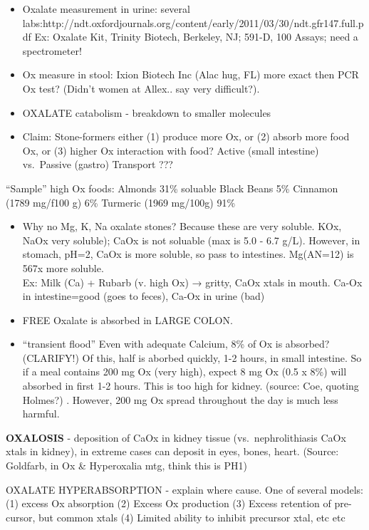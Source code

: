 \begin{itemize}
\tightlist
\item
  Oxalate measurement in urine: several
  labs:http://ndt.oxfordjournals.org/content/early/2011/03/30/ndt.gfr147.full.pdf
  Ex: Oxalate Kit, Trinity Biotech, Berkeley, NJ; 591-D, 100 Assays;
  need a spectrometer!\\
\item
  Ox measure in stool: Ixion Biotech Inc (Alac hug, FL) more exact then
  PCR Ox test? (Didn't women at Allex.. say very difficult?).
\item
  OXALATE catabolism - breakdown to smaller molecules
\item
  Claim: Stone-formers either (1) produce more Ox, or (2) absorb more
  food Ox, or (3) higher Ox interaction with food? Active (small
  intestine) vs.~Passive (gastro) Transport ???
\end{itemize}

``Sample'' high Ox foods: Almonds 31\% soluable Black Beans 5\% Cinnamon
(1789 mg/f100 g) 6\% Turmeric (1969 mg/100g) 91\%

\begin{itemize}
\tightlist
\item
  Why no Mg, K, Na oxalate stones? Because these are very soluble. KOx,
  NaOx very soluble); CaOx is not soluable (max is 5.0 - 6.7 g/L).
  However, in stomach, pH=2, CaOx is more soluble, so pass to
  intestines. Mg(AN=12) is 567x more soluble.\\
  Ex: Milk (Ca) + Rubarb (v. high Ox) → gritty, CaOx xtals in mouth.
  Ca-Ox in intestine=good (goes to feces), Ca-Ox in urine (bad)
\item
  FREE Oxalate is absorbed in LARGE COLON.
\item
  ``transient flood'' Even with adequate Calcium, 8\% of Ox is absorbed?
  (CLARIFY!) Of this, half is aborbed quickly, 1-2 hours, in small
  intestine. So if a meal contains 200 mg Ox (very high), expect 8 mg Ox
  (0.5 x 8\%) will absorbed in first 1-2 hours. This is too high for
  kidney. (source: Coe, quoting Holmes?) . However, 200 mg Ox spread
  throughout the day is much less harmful.
\end{itemize}

\textbf{OXALOSIS} - deposition of CaOx in kidney tissue
(vs.~nephrolithiasis CaOx xtals in kidney), in extreme cases can deposit
in eyes, bones, heart. (Source: Goldfarb, in Ox \& Hyperoxalia mtg,
think this is PH1)

OXALATE HYPERABSORPTION - explain \textbar{} where \textbar{} cause. One
of several models: (1) excess Ox absorption (2) Excess Ox production (3)
Excess retention of pre-cursor, but common xtals (4) Limited ability to
inhibit precursor xtal, etc etc

